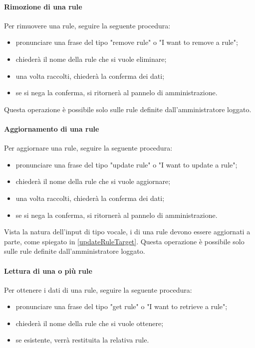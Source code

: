 \paragraph{Rimozione di una rule}
Per rimuovere una rule, seguire la seguente procedura:
\begin{itemize}
	\item pronunciare una frase del tipo "remove rule" o "I want to remove a rule";
	\item \PROGETTO{} chiederà il nome della rule che si vuole eliminare;
	\item una volta raccolti, \PROGETTO{} chiederà la conferma dei dati;
	\item se si nega la conferma, si ritornerà al pannelo di amministrazione.
\end{itemize}
Questa operazione è possibile solo sulle rule definite dall'amministratore loggato.
\paragraph{Aggiornamento di una rule}
Per aggiornare una rule, seguire la seguente procedura:
\begin{itemize}
	\item pronunciare una frase del tipo "update rule" o "I want to update a rule";
	\item \PROGETTO{} chiederà il nome della rule che si vuole aggiornare;
	\item una volta raccolti, \PROGETTO{} chiederà la conferma dei dati;
	\item se si nega la conferma, si ritornerà al pannelo di amministrazione.
\end{itemize}
Vista la natura dell'input di tipo vocale, i  di una rule devono essere aggiornati a parte, come spiegato in \ref{updateRuleTarget}.
Questa operazione è possibile solo sulle rule definite dall'amministratore loggato.
\paragraph{Lettura di una o più rule}
Per ottenere i dati di una rule, seguire la seguente procedura:
\begin{itemize}
	\item pronunciare una frase del tipo "get rule" o "I want to retrieve a rule";
	\item \PROGETTO{} chiederà il nome della rule che si vuole ottenere;
	\item se esistente, verrà restituita la relativa rule.
\end{itemize}

